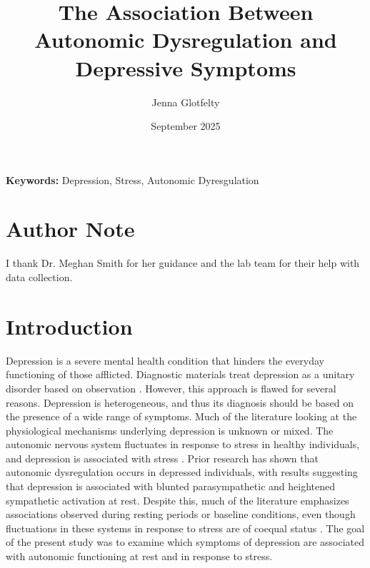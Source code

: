 \documentclass[12pt]{article}
\begin{document}
\title{The Association Between Autonomic Dysregulation and Depressive Symptoms}
\author{Jenna Glotfelty}
\date{September 2025}
\maketitle
\begin{center}
\textbf{Keywords:} Depression, Stress, Autonomic Dyresgulation
\end{center}
\section*{Author Note}

I thank Dr. Meghan Smith for her guidance and the lab team for their help with data collection.


\newpage
\section{Introduction}
Depression is a severe mental health condition that hinders the everyday functioning of those afflicted. Diagnostic materials treat depression as a unitary disorder based on observation \parencite{stringaris_editorial_2017}. However, this approach is flawed for several reasons. Depression is heterogeneous, and thus its diagnosis should be based on the presence of a wide range of symptoms. Much of the literature looking at the physiological mechanisms underlying depression is unknown or mixed. The autonomic nervous system fluctuates in response to stress in healthy individuals, and depression is associated with stress \parencite{remes_biological_2021}. Prior research has shown that autonomic dysregulation occurs in depressed individuals, with results suggesting that depression is associated with blunted parasympathetic and heightened sympathetic activation at rest. Despite this, much of the literature emphasizes associations observed during resting periods or baseline conditions, even though fluctuations in these systems in response to stress are of coequal status\parencite{Rottenberg2007RSA}  %
. The goal of the present study was to examine which symptoms of depression are associated with autonomic functioning at rest and in response to stress.
\end{document}
